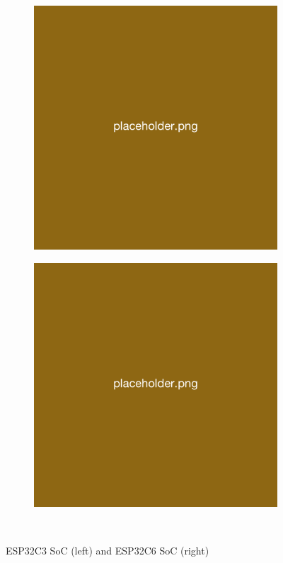 \begin{figure}[H]
    \centering
    \begin{subfigure}{0.15\textwidth}
        \includegraphics[width=\linewidth]{overleaf/images/placeholder.png}
    \end{subfigure}
    \hspace{10pt}
    \begin{subfigure}{0.15\textwidth}
        \includegraphics[width=\linewidth]{overleaf/images/placeholder.png}
    \end{subfigure}
    \\\vspace{\ftspace}
    \caption{ESP32C3 SoC (left) and ESP32C6 SoC (right)}
    \label{fig:ESP32soc}
\end{figure}

